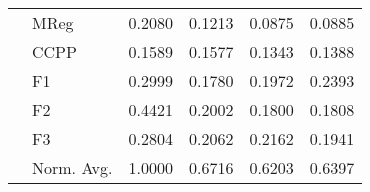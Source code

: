 \begin{table}[hbtp!]
{\begin{tabular}{l|l|c|c|c|c}
 & MReg & 0.2080 & 0.1213 & 0.0875 & 0.0885\\
 & CCPP & 0.1589 & 0.1577 & 0.1343 & 0.1388\\
 & F1   & 0.2999 & 0.1780 & 0.1972 & 0.2393\\
 & F2   & 0.4421 & 0.2002 & 0.1800 & 0.1808\\
 & F3   & 0.2804 & 0.2062 & 0.2162 & 0.1941\\
 \cline{2-6}
 & Norm. Avg. & 1.0000 & 0.6716 & 0.6203 & 0.6397\\
\end{tabular}
}
    \label{tab:SPSA_results}
\end{table}

\begin{table}[hbtp!]
    \centering
    \caption{Parameter-shift rule results. For each individual dataset the reported loss is the average computed over 5 trials. The Normalized average error with respect to standard SPSA (Norm. Avg.), computed over all trials for all datasets, is given at the bottom of each method.}
    \label{tab:Parameter_shift_results}
\end{table}

